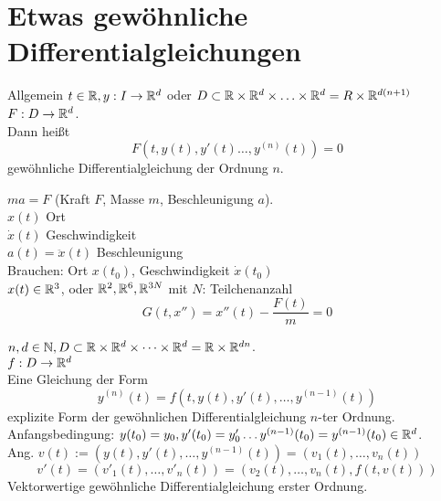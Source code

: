 \documentclass[../ana2.tex]{subfiles}
\begin{document}
\setcounter{section}{19}
\section{Etwas gewöhnliche Differentialgleichungen}
Allgemein \( t \in \mathbb{R}, y:I\rightarrow \mathbb{R}^d \) oder 
\( D \subset \mathbb{R} \times \mathbb{R}^d \times \ldots \times \mathbb{R}^d = R \times \mathbb{R}^{d(n+1)} \)
\( F:D\rightarrow \mathbb{R}^d \).\\
Dann heißt 
\[ F(t, y(t), y'(t) \ldots, y^{(n)}(t)) = 0 \]
gewöhnliche Differentialgleichung der Ordnung \(n\).
\begin{bsp}[Newton]
    \( m a = F \) (Kraft \(F\), Masse \(m\), Beschleunigung \(a\)).\\
    \( x(t) \) Ort\\
    \( \dot{x}(t) \) Geschwindigkeit \\
    \( a(t) = \ddot{x}(t) \) Beschleunigung\\
    Brauchen: Ort \(x(t_0)\), Geschwindigkeit \( \dot{x}(t_0) \)\\
    \( x(t) \in \mathbb{R}^3\), oder \( \mathbb{R}^2, \mathbb{R}^6, \mathbb{R}^{3N} \) mit \(N\): Teilchenanzahl
    \[G(t, x'') = x''(t) - \frac{F(t)}{m} = 0 \]
\end{bsp}
\begin{defi}
    \(n, d \in \mathbb{N}, D \subset \mathbb{R} \times \mathbb{R}^d \times \cdots \times \mathbb{R}^d = \mathbb{R} \times \mathbb{R}^{dn}\).\\
    \(f:D\rightarrow \mathbb{R}^d\)\\
    Eine Gleichung der Form 
    \[ y^{(n)}(t) = f(t, y(t), y'(t), \ldots, y^{(n-1)}(t)) \]
    explizite Form der gewöhnlichen Differentialgleichung \(n\)-ter Ordnung.\\
    Anfangsbedingung: \( y(t_0) = y_0, y'(t_0) = y'_0 
    \ldots y^{(n-1)}(t_0) = y^{(n-1)}(t_0) \in \mathbb{R}^d \).\\
    Ang. \( v(t) := (y(t), y'(t), \ldots, y^{(n-1)}(t)) = (v_1(t), \ldots, v_n(t)) \)\\
    \[ v'(t) = (v'_1(t), \ldots, v'_n(t)) 
    = (v_2(t), \ldots, v_n(t), f(t,v(t))) \]
    Vektorwertige gewöhnliche Differentialgleichung erster Ordnung.
\end{defi}
\end{document}
